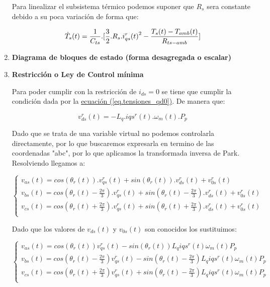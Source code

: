 \documentclass{article}
\begin{document}
\begin{enumerate}[label=\roman*.]
    Para linealizar el subsistema térmico podemos suponer que $R_s$ sera constante debido a su poca variación
    de forma que:

    \begin{equation}
        \dot{T}_{s}(t) = \frac{1}{C_{ts}}.[\frac{3}{2}.R_{s}.{i_{qs}^r(t)}^2 - \frac{T_{s}(t)-T_{amb}(t)}{R_{ts-amb}}]\\
    \end{equation}
        
    \item \textbf{Diagrama de bloques de estado (forma desagregada o escalar)}
    
    
    \item \textbf{Restricción o Ley de Control mínima}

    Para poder cumplir con la restricción de $i_{ds} = 0$ se tiene que cumplir la condición dada por la
    \hyperref[eq.tensiones_qd0]{ecuación (\ref*{eq.tensiones_qd0})}. De manera que:

    \begin{equation}
        v_{ds}^r(t) = -L_{q}.i{qs}^r(t).\omega_{m}(t).P_{p}
    \end{equation}

    Dado que se trata de una variable virtual no podemos controlarla directamente, por lo que buscaremos
    expresarla en termino de las coordenadas "abc", por lo que aplicamos la transformada inversa de Park.
    Resolviendo llegamos a:

    \begin{equation}
        \begin{cases}
            v_{as}(t) = cos(\theta_{r}(t)).v_{qs}^r(t) + sin(\theta_{r}(t)).v_{ds}^r(t) + v_{0s}^r(t)\\
            v_{bs}(t) = cos(\theta_{r}(t) - \frac{2\pi}{3}).v_{qs}^r(t) + sin(\theta_{r}(t) - \frac{2\pi}{3}).v_{ds}^r(t) + v_{0s}^r(t)\\
            v_{cs}(t) = cos(\theta_{r}(t) + \frac{2\pi}{3}).v_{qs}^r(t) + sin(\theta_{r}(t) + \frac{2\pi}{3}).v_{ds}^r(t) + v_{0s}^r(t)\\
        \end{cases}
    \end{equation}

    Dado que los valores de $v_{ds}(t)$ y $v_{0s}(t)$ son conocidos los sustituimos: 

    \begin{equation}
        \begin{cases}
            v_{as}(t) = cos(\theta_{r}(t))v_{qs}^r(t) - sin(\theta_{r}(t))L_{q}i{qs}^r(t)\omega_{m}(t)P_{p}\\
            v_{bs}(t) = cos(\theta_{r}(t) - \frac{2\pi}{3})v_{qs}^r(t) - sin(\theta_{r}(t) - \frac{2\pi}{3})L_{q}i{qs}^r(t)\omega_{m}(t)P_{p}\\
            v_{cs}(t) = cos(\theta_{r}(t) + \frac{2\pi}{3})v_{qs}^r(t) + sin(\theta_{r}(t) - \frac{2\pi}{3})L_{q}i{qs}^r(t)\omega_{m}(t)P_{p}\\
        \end{cases}
    \end{equation}


\end{enumerate}
\end{document}

